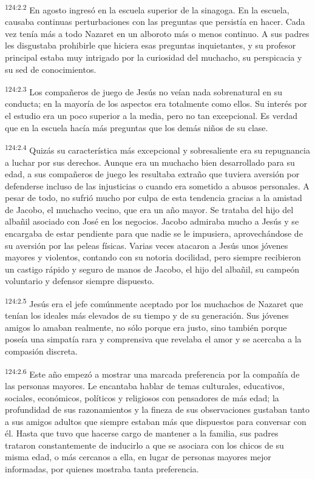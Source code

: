 \par
\textsuperscript{124:2.2} En agosto ingresó en la escuela superior de la sinagoga. En la escuela, causaba continuas perturbaciones con las preguntas que persistía en hacer. Cada vez tenía más a todo Nazaret en un alboroto más o menos continuo. A sus padres les disgustaba prohibirle que hiciera esas preguntas inquietantes, y su profesor principal estaba muy intrigado por la curiosidad del muchacho, su perspicacia y su sed de conocimientos.

\par
\textsuperscript{124:2.3} Los compañeros de juego de Jesús no veían nada sobrenatural en su conducta; en la mayoría de los aspectos era totalmente como ellos. Su interés por el estudio era un poco superior a la media, pero no tan excepcional. Es verdad que en la escuela hacía más preguntas que los demás niños de su clase.

\par
\textsuperscript{124:2.4} Quizás su característica más excepcional y sobresaliente era su repugnancia a luchar por sus derechos. Aunque era un muchacho bien desarrollado para su edad, a sus compañeros de juego les resultaba extraño que tuviera aversión por defenderse incluso de las injusticias o cuando era sometido a abusos personales. A pesar de todo, no sufrió mucho por culpa de esta tendencia gracias a la amistad de Jacobo, el muchacho vecino, que era un año mayor. Se trataba del hijo del albañil asociado con José en los negocios. Jacobo admiraba mucho a Jesús y se encargaba de estar pendiente para que nadie se le impusiera, aprovechándose de su aversión por las peleas físicas. Varias veces atacaron a Jesús unos jóvenes mayores y violentos, contando con su notoria docilidad, pero siempre recibieron un castigo rápido y seguro de manos de Jacobo, el hijo del albañil, su campeón voluntario y defensor siempre dispuesto.

\par
\textsuperscript{124:2.5} Jesús era el jefe comúnmente aceptado por los muchachos de Nazaret que tenían los ideales más elevados de su tiempo y de su generación. Sus jóvenes amigos lo amaban realmente, no sólo porque era justo, sino también porque poseía una simpatía rara y comprensiva que revelaba el amor y se acercaba a la compasión discreta.

\par
\textsuperscript{124:2.6} Este año empezó a mostrar una marcada preferencia por la compañía de las personas mayores. Le encantaba hablar de temas culturales, educativos, sociales, económicos, políticos y religiosos con pensadores de más edad; la profundidad de sus razonamientos y la fineza de sus observaciones gustaban tanto a sus amigos adultos que siempre estaban más que dispuestos para conversar con él. Hasta que tuvo que hacerse cargo de mantener a la familia, sus padres trataron constantemente de inducirlo a que se asociara con los chicos de su misma edad, o más cercanos a ella, en lugar de personas mayores mejor informadas, por quienes mostraba tanta preferencia.

